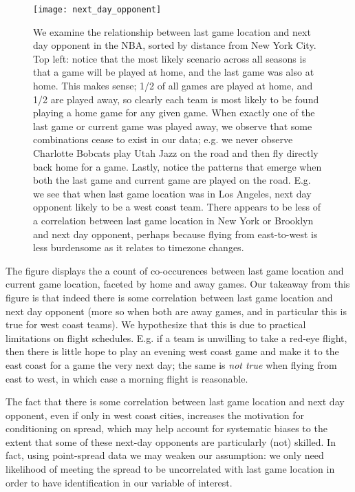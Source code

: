 \documentclass[letterpaper,12pt]{article}
\begin{document}
\begin{figure}
  \centering
  \label{fig: next day opponent}
  \texttt{[image: next\_day\_opponent]}
  \caption{We examine the relationship between last game location and next day opponent in the NBA, sorted by distance from New York City. 
Top left: notice that the most likely scenario across all seasons is that a game will be played at home, and the last game was also at home. This makes sense; 1/2 of all games are played at home, and 1/2 are played away, so clearly each team is most likely to be found playing a home game for any given game. When exactly one of the last game or current game was played away,
we observe that some combinations cease to exist in our data; e.g. we never observe Charlotte Bobcats play Utah Jazz on the road and then fly directly back home for a game. Lastly, notice the patterns that emerge when both the last game and current game are played on the road. E.g. we see that when last game location was in Los Angeles, next day opponent likely to be a west coast team. There appears to be less of a correlation between last game location in New York or Brooklyn and next day opponent, perhaps because flying from east-to-west
is less burdensome as it relates to timezone changes.} 
\end{figure}

The figure displays the a count of co-occurences between last game location and current game location, faceted by home and away games.
Our takeaway from this figure is that indeed there is some correlation between last game location
and next day opponent (more so when both are away games,  
and in particular this is true for west coast teams). We hypothesize that
this is due to practical limitations on flight schedules. E.g. if a team is unwilling to take a red-eye
flight, then there is little hope to play an evening west coast game and make it to the east coast for a game the very next day;
the same is \emph{not true} when flying from east to west, in which case a morning flight is reasonable.


The fact that there is some correlation between last game location and next day opponent, even if only in west coast cities, increases the motivation for conditioning on spread, which may help account for systematic biases to the extent that some of these next-day opponents are particularly (not) skilled. 
In fact, using point-spread data we may weaken our assumption: we only need
likelihood of meeting the spread to be uncorrelated with last game location
in order to have identification in our variable of interest.
\end{document}
